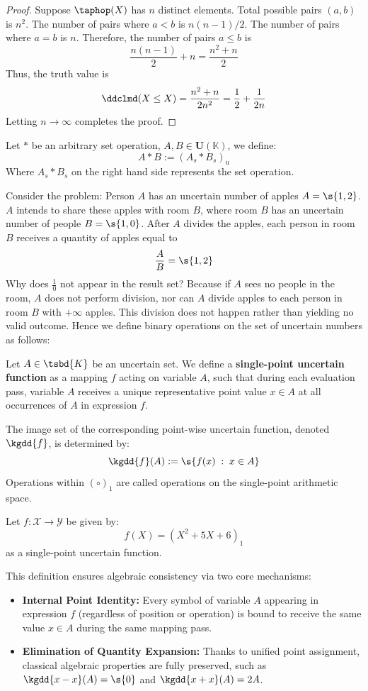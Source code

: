 \begin{proof}
	Suppose $\taphop(X)$ has $n$ distinct elements. Total possible pairs $(a,b)$ is $n^2$. The number of pairs where $a<b$ is $n(n-1)/2$. The number of pairs where $a=b$ is $n$. Therefore, the number of pairs $a\leq b$ is $$\frac{n(n-1)}{2} + n = \frac{n^2+n}{2}$$ 
	Thus, the truth value is $$\ddclmd(X\leq X ) = \frac{n^2+n}{2n^2} = \frac{1}{2} + \frac{1}{2n}$$
	Letting $n \rightarrow \infty$ completes the proof.
\end{proof}
\begin{definition}
	Let $*$ be an arbitrary set operation, $A, B \in \mathbf{U}(\mathbb{K})$, we define:
	\[
	A * B := (A_s * B_s)_u
	\]
	Where $A_s * B_s$ on the right hand side represents the set operation.
\end{definition}
\begin{example}
	Consider the problem: Person $A$ has an uncertain number of apples $A=\s{1,2}$. $A$ intends to share these apples with room $B$, where room $B$ has an uncertain number of people $B = \s{1,0}$. After $A$ divides the apples, each person in room $B$ receives a quantity of apples equal to \[\frac{A}{B} = \s{1,2}\] Why does $\frac{1}{0}$ not appear in the result set? Because if $A$ sees no people in the room, $A$ does not perform division, nor can $A$ divide apples to each person in room $B$ with $+\infty$ apples. This division does not happen rather than yielding no valid outcome. Hence we define binary operations on the set of uncertain numbers as follows:
\end{example}
\begin{definition}
	Let $A \in \tsbd{K}$ be an uncertain set. We define a \textbf{single-point uncertain function} as a mapping $f$ acting on variable $A$, such that during each evaluation pass, variable $A$ receives a unique representative point value $x \in A$ at all occurrences of $A$ in expression $f$.
	
	The image set of the corresponding point-wise uncertain function, denoted $\kgdd{f}$, is determined by:
	\[
	\kgdd{f}(A) := \s{f(x) \;:\; x \in A}
	\]
	Operations within $(\circ)_1$ are called operations on the single-point arithmetic space.
\end{definition}
\begin{example}
	Let $f : \mathcal{X} \to \mathcal{Y}$ be given by:
	\[f(X) = (X^2+5X+6)_1\] as a single-point uncertain function.
\end{example}
\begin{remark}
	This definition ensures algebraic consistency via two core mechanisms:
	\begin{itemize}
		\item \textbf{Internal Point Identity:} Every symbol of variable $A$ appearing in expression $f$ (regardless of position or operation) is bound to receive the same value $x \in A$ during the same mapping pass.
		\item \textbf{Elimination of Quantity Expansion:} Thanks to unified point assignment, classical algebraic properties are fully preserved, such as $\kgdd{x - x}(A) = \s{0}$ and $\kgdd{x + x}(A) = 2A$.
	\end{itemize}
\end{remark}

